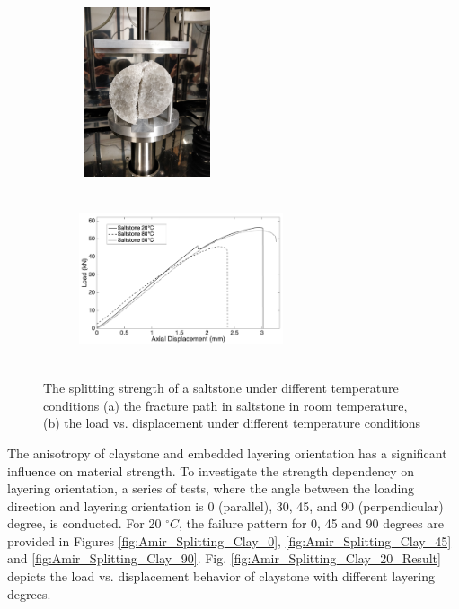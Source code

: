 \begin{figure}[!ht]
\centering
\begin{subfigure}[c]{0.35\textwidth}
\centering
\includegraphics[width=4cm,height=5cm]{figures/Amir_Splitting_Salt_20.png}
\subcaption{}
\label{fig:Amir_Splitting_Salt_20}
\end{subfigure}
\hfill
\begin{subfigure}[c]{0.6\textwidth}
\centering
\includegraphics[width=6cm,height=5cm]{figures/Amir_Splitting_Salt_Result.png}
\subcaption{}
\label{fig:Amir_Splitting_Salt_Result}
\end{subfigure}
\caption{The splitting strength of a saltstone under different temperature conditions (a) the fracture path in saltstone in room temperature, (b) the load vs. displacement under different temperature conditions}
\end{figure}

The anisotropy of claystone and embedded layering orientation has a significant influence on material strength. To investigate the strength dependency on layering orientation, a series of tests, where the angle between the loading direction and layering orientation is 0 (parallel), 30, 45, and 90 (perpendicular) degree, is conducted. For 20 $^{\circ}C$, the failure pattern for 0, 45 and 90 degrees are provided in Figures \ref{fig:Amir_Splitting_Clay_0}, \ref{fig:Amir_Splitting_Clay_45} and \ref{fig:Amir_Splitting_Clay_90}. Fig. \ref{fig:Amir_Splitting_Clay_20_Result} depicts the load vs. displacement behavior of claystone with different layering degrees. 

